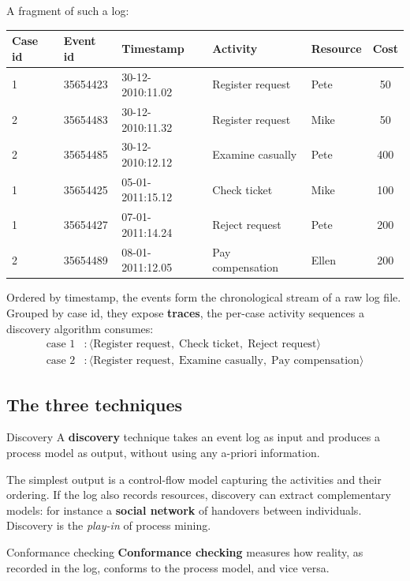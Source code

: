 A fragment of such a log:
\begin{center}
\small
\begin{tabular}{lllllc}
\toprule
\textbf{Case id} & \textbf{Event id} & \textbf{Timestamp} & \textbf{Activity} & \textbf{Resource} & \textbf{Cost} \\
\midrule
1 & 35654423 & 30-12-2010:11.02 & Register request & Pete  &  50 \\
2 & 35654483 & 30-12-2010:11.32 & Register request & Mike  &  50 \\
2 & 35654485 & 30-12-2010:12.12 & Examine casually & Pete  & 400 \\
1 & 35654425 & 05-01-2011:15.12 & Check ticket     & Mike  & 100 \\
1 & 35654427 & 07-01-2011:14.24 & Reject request   & Pete  & 200 \\
2 & 35654489 & 08-01-2011:12.05 & Pay compensation & Ellen & 200 \\
\bottomrule
\end{tabular}
\end{center}
Ordered by timestamp, the events form the chronological stream of a raw log file. Grouped by case id, they expose \textbf{traces}, the per-case activity sequences a discovery algorithm consumes:
\[
\begin{aligned}
  \text{case 1} &: \langle \text{Register request},\; \text{Check ticket},\; \text{Reject request} \rangle \\
  \text{case 2} &: \langle \text{Register request},\; \text{Examine casually},\; \text{Pay compensation} \rangle
\end{aligned}
\]

\subsection{The three techniques}

\begin{definitionbox}{Discovery}
A \textbf{discovery} technique takes an event log as input and produces a process model as output, without using any a-priori information.
\end{definitionbox}

The simplest output is a control-flow model capturing the activities and their ordering. If the log also records resources, discovery can extract complementary models: for instance a \textbf{social network} of handovers between individuals. Discovery is the \emph{play-in} of process mining.

\begin{definitionbox}{Conformance checking}
\textbf{Conformance checking} measures how reality, as recorded in the log, conforms to the process model, and vice versa.
\end{definitionbox}

